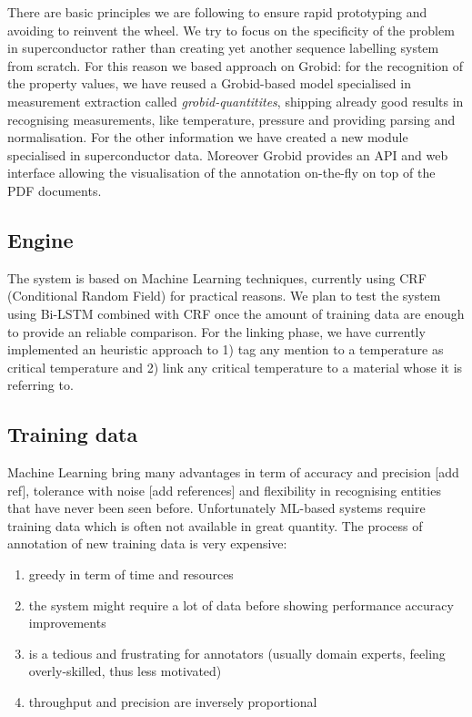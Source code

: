 \documentclass{article}
\begin{document}
There are basic principles we are following to ensure rapid prototyping and avoiding to reinvent the wheel. We try to focus on the specificity of the problem in superconductor rather than creating yet another sequence labelling system from scratch. For this reason we based approach on Grobid\cite{GROBID}: for the recognition of the property values, we have reused a Grobid-based model specialised in measurement extraction called \textit{grobid-quantitites}\cite{grobid-quantities}, shipping already good results in recognising measurements, like temperature, pressure and providing parsing and normalisation. For the other information we have created a new module specialised in superconductor data. Moreover Grobid provides an API and web interface allowing the visualisation of the annotation on-the-fly on top of the PDF documents. 

\subsection{Engine}
\label{sec:overview}
The system is based on Machine Learning techniques, currently using CRF (Conditional Random Field) for practical reasons. We plan to test the system using Bi-LSTM combined with CRF once the amount of training data are enough to provide an reliable comparison. 
For the linking phase, we have currently implemented an heuristic approach to 1) tag any mention to a temperature as critical temperature and 2) link any critical temperature to a material whose it is referring to. 

\subsection{Training data}

Machine Learning bring many advantages in term of accuracy and precision [add ref], tolerance with noise [add references] and flexibility in recognising entities that have never been seen before. 
Unfortunately ML-based systems require training data which is often not available in great quantity. 
The process of annotation of new training data is very expensive: 
\begin{enumerate}
    \item greedy in term of time and resources
    \item the system might require a lot of data before showing performance accuracy improvements
    \item is a tedious and frustrating for annotators (usually domain experts,  feeling overly-skilled, thus less motivated)
    \item throughput and precision are inversely proportional
\end{enumerate}
\end{document}
